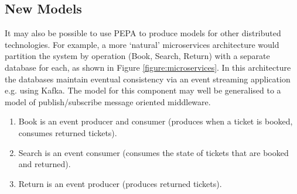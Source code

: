 \subsection{New Models}
It may also be possible to use PEPA to produce models for other distributed technologies.  For example, a more `natural' microservices architecture would partition the system by operation (Book, Search, Return) with a separate database for each, as shown in Figure \ref{figure:microservices}.  In this architecture the databases maintain eventual consistency via an event streaming application e.g. using Kafka.  The model for this component may well be generalised to a model of publish/subscribe message oriented middleware.
\begin{enumerate}
\item Book is an event producer and consumer (produces when a ticket is booked, consumes returned tickets).
\item Search is an event consumer (consumes the state of tickets that are booked and returned).
\item Return is an event producer (produces returned tickets).
\end{enumerate}


